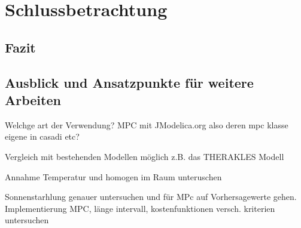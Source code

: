 %
%

\renewcommand{\chapterheadstartvskip}{\vspace*{3cm}}

\chapter{Schlussbetrachtung}
\label{chap:schlussteil}
\renewcommand{\chapterheadstartvskip}{\vspace*{-0.5cm}}

\section{Fazit}
\label{sec:zusammenfassung}



\section{Ausblick und Ansatzpunkte für weitere Arbeiten}
\label{sec:ausblick}

Welchge art der Verwendung?
MPC mit JModelica.org also deren mpc klasse
eigene in casadi
etc?

Vergleich mit bestehenden Modellen möglich z.B. das THERAKLES Modell

Annahme Temperatur und homogen im Raum unteruschen

Sonnenstarhlung genauer untersuchen und für MPc auf Vorhersagewerte gehen.
Implementierung MPC, länge intervall, kostenfunktionen versch. kriterien untersuchen